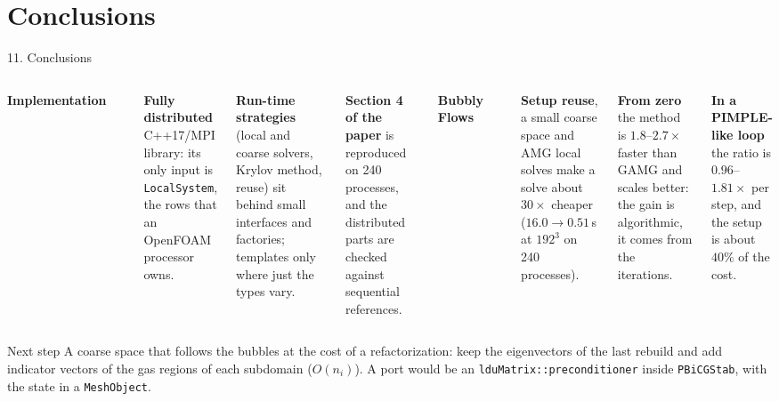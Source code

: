 \documentclass[aspectratio=169,10pt]{beamer}
\newcommand{\code}[1]{\texttt{#1}}
\begin{document}
\section{Conclusions}

\begin{frame}{11. Conclusions}
  \small
  \begin{columns}[T,onlytextwidth]
    {\textbf{\color{schwarz}Implementation}\par}\vspace{0.8mm}
    {\color{boxedge}\hrule height 0.5pt}\vspace{2mm}
    \footnotesize\setlength{\parskip}{5pt}%
    \textbf{\color{schwarz}Fully distributed} C++17/MPI library: its only input is \code{LocalSystem}, the rows
    that an OpenFOAM processor owns.

    \textbf{\color{schwarz}Run-time strategies} (local and coarse solvers, Krylov method, reuse) sit behind
    small interfaces and factories; templates only where just the types vary.

    \textbf{\color{schwarz}Section 4 of the paper} is reproduced on 240 processes, and the distributed parts
    are checked against sequential references.
    {\textbf{\color{gamg}Bubbly Flows}\par}\vspace{0.8mm}
    {\color{boxedge}\hrule height 0.5pt}\vspace{2mm}
    \footnotesize\setlength{\parskip}{5pt}%
    \textbf{\color{gamg}Setup reuse}, a small coarse space and AMG local solves make a solve about
    $30\times$ cheaper ($16.0\to0.51$\,s at $192^3$ on 240 processes).

    \textbf{\color{gamg}From zero} the method is $1.8$--$2.7\times$ faster than GAMG and scales better:
    the gain is algorithmic, it comes from the iterations.

    \textbf{\color{gamg}In a PIMPLE-like loop} the ratio is $0.96$--$1.81\times$ per step, and the setup is
    about $40\%$ of the cost.
  \end{columns}
  \vspace{3mm}
  \begin{block}{Next step}
    \footnotesize A coarse space that \alert{follows the bubbles} at the cost of a refactorization: keep the
    eigenvectors of the last rebuild and add indicator vectors of the gas regions of each subdomain
    ($O(n_i)$). A port would be an \code{lduMatrix::preconditioner} inside \code{PBiCGStab}, with the state
    in a \code{MeshObject}.
  \end{block}
\end{frame}
\end{document}
